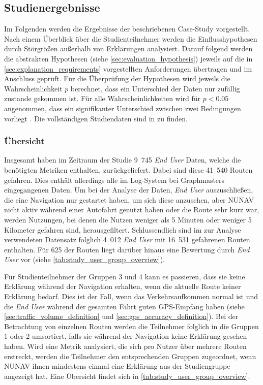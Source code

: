 \subsection{Studienergebnisse}
\label{sec:study_results_quantitativ}

Im Folgenden werden die Ergebnisse der beschriebenen Case-Study vorgestellt. Nach einem Überblick über die Studienteilnehmer werden die Einflusshypothesen durch Störgrößen außerhalb von Erklärungen analysiert. Darauf folgend werden die abstrakten Hypothesen (siehe \autoref{sec:evaluation_hypothesis}) jeweils auf die in \autoref{sec:explanation_requirements} vorgestellten Anforderungen übertragen und im Anschluss geprüft. Für die Überprüfung der Hypothesen wird jeweils die Wahrscheinlichkeit $ p $ berechnet, dass ein Unterschied der Daten nur zufällig zustande gekommen ist. Für alle Wahrscheinlichkeiten wird für $ p < 0.05 $ angenommen, dass ein signifikanter Unterschied zwischen zwei Bedingungen vorliegt \cite[vgl.][]{wohlin2012experimentation}. Die vollständigen Studiendaten sind in  zu finden.

\subsubsection{Übersicht}

Insgesamt haben im Zeitraum der Studie 9~745 \textit{End User} Daten, welche die benötigten Metriken enthalten, zurückgeliefert. Dabei sind diese 41~540 Routen gefahren. Dies enthält allerdings alle im Log-System bei Graphmasters eingegangenen Daten. Um bei der Analyse der Daten, \textit{End User} auszuschließen, die eine Navigation nur gestartet haben, um sich diese anzusehen, aber NUNAV nicht aktiv während einer Autofahrt genutzt haben oder die Route sehr kurz war, werden Nutzungen, bei denen die Nutzen weniger als 5 Minuten oder weniger 5 Kilometer gefahren sind, herausgefiltert. Schlussendlich sind im zur Analyse verwendeten Datensatz folglich 4~012 \textit{End User} mit 16~531 gefahrenen Routen enthalten. Für 625 der Routen liegt darüber hinaus eine Bewertung durch \textit{End User} vor (siehe \autoref{tab:study_user_group_overview}).

Für Studienteilnehmer der Gruppen 3 und 4 kann es passieren, dass sie keine Erklärung während der Navigation erhalten, wenn die aktuelle Route keiner Erklärung bedarf. Dies ist der Fall, wenn das Verkehrsaufkommen \glqq normal\grqq{} ist und die \textit{End User} während der gesamten Fahrt guten GPS-Empfang haben (siehe \autoref{sec:traffic_volume_definition} und \autoref{sec:gps_accuracy_definition}). Bei der Betrachtung von einzelnen Routen werden die Teilnehmer folglich in die Gruppen 1 oder 2 umsortiert, falls sie während der Navigation keine Erklärung gesehen haben. Wird eine Metrik analysiert, die sich pro Nutzer über mehrere Routen erstreckt, werden die Teilnehmer den entsprechenden Gruppen zugeordnet, wenn NUNAV ihnen mindestens einmal eine Erklärung aus der Studiengruppe angezeigt hat. Eine Übersicht findet sich in \autoref{tab:study_user_group_overview}.

